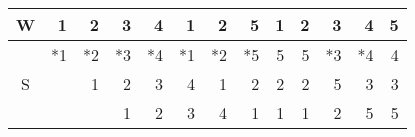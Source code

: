\documentclass{standalone}
\begin{document}
\begin{tabular}{c|rrrrrrrrrrrr}
W & 1 & 2 & 3 & 4 & 1 & 2 & 5 & 1 & 2 & 3 & 4 & 5 \\
\hline
\multirow{3}{*}{S}
 & *1 & *2 & *3 & *4 & *1 & *2 & *5 & 5 & 5 & *3 & *4 & 4 \\
 &    &  1 &  2 &  3 &  4 &  1 &  2 & 2 & 2 &  5 &  3 & 3 \\
 &    &    &  1 &  2 &  3 &  4 &  1 & 1 & 1 &  2 &  5 & 5 \\
\end{tabular}
\end{document}

